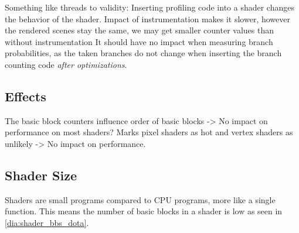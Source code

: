 \clearpage
{}
Something like threads to validity: Inserting profiling code into a shader changes the behavior of the shader.
Impact of instrumentation makes it slower, however the rendered scenes stay the same, we may get smaller counter values than without instrumentation
It should have no impact when measuring branch probabilities, as the taken branches do not change when inserting the branch counting code \emph{after optimizations}.

\subsection{Effects}
\label{sub:effets}
The basic block counters influence order of basic blocks -> No impact on performance on most shaders?
Marks pixel shaders as hot and vertex shaders as unlikely -> No impact on performance.

\subsection{Shader Size}
\label{sub:size}
Shaders are small programs compared to CPU programs, more like a single function. This means the number of basic blocks in a shader is low as seen in \cref{dia:shader_bbs_dota}.

\begin{figure}
\pgfplotsset{width=\textwidth}
\centering
\begin{minipage}[t]{.45\textwidth}
\centering
{}
\label{dia:shader_bbs_dota}
\end{minipage}\qquad
\begin{minipage}[t]{.45\textwidth}
\centering
{}
\label{dia:shader_bbs_ashes}
\end{minipage}
\end{figure}

